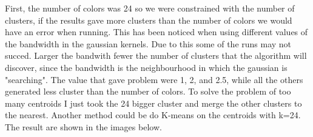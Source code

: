 \documentclass{ETHExercise}
\begin{document}
First, the number of colors was 24 so we were constrained with the number of clusters, 
if the results gave more clusters than the number of colors we would have an error when running.
This has been noticed when using different values of the bandwidth in the gaussian kernels.
Due to this some of the runs may not succed. Larger the bandwith fewer the number of clusters that the 
algorithm will discover, since the bandwidth is the neighbourhood in which the gaussian is "searching". The value that gave problem were 1, 2, and 2.5, 
while all the others generated less cluster than the number of colors.
To solve the problem of too many centroids I just took the 24 bigger cluster and merge the other clusters to the nearest.
Another method could be do K-means on the centroids with k=24.
The result are shown in the images below.
\end{document}
